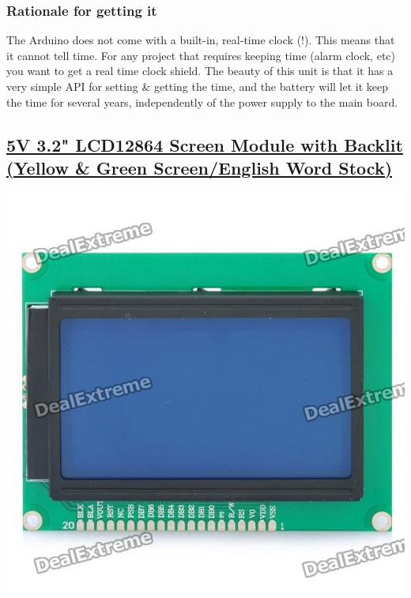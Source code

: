 \documentclass[11pt]{article}
\begin{document}
\subsubsection{Rationale for getting it}
\label{sec-4-8-1}

The Arduino does not come with a built-in, real-time clock (!). This means that it cannot tell time. For any project that requires keeping time (alarm clock, etc) you want to get a real time clock shield. The beauty of this unit is that it has a very simple API for setting \& getting the time, and the battery will let it keep the time for several years, independently of the power supply to the main board.
\subsection{\href{http://dx.com/p/5v-3-2-lcd12864-screen-module-with-backlit-yellow-green-screen-english-word-stock-121820}{5V 3.2" LCD12864 Screen Module with Backlit (Yellow \& Green Screen/English Word Stock)}}
\label{sec-4-9}
\includegraphics[width=.9\linewidth]{./files/sku_121820_1.jpg}
\end{document}

